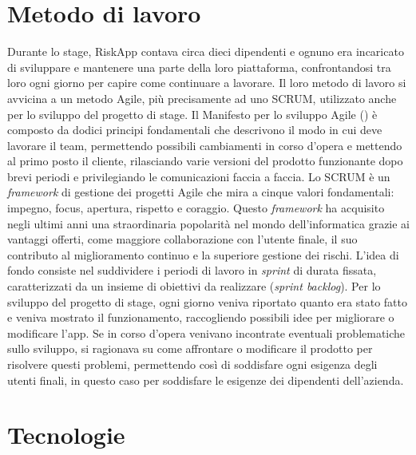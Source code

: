 \section{Metodo di lavoro}
Durante lo stage, RiskApp contava circa dieci dipendenti e ognuno era incaricato di sviluppare e mantenere una parte della loro piattaforma, confrontandosi tra loro ogni giorno per capire come continuare a lavorare.\newline
Il loro metodo di lavoro si avvicina a un metodo Agile, più precisamente ad uno SCRUM, utilizzato anche per lo sviluppo del progetto di stage.\newline
\newline
Il Manifesto per lo sviluppo Agile (\cite{site:manifesto-agile}) è composto da dodici principi fondamentali che descrivono il modo in cui deve lavorare il team, permettendo possibili cambiamenti in corso d'opera e mettendo al primo posto il cliente, rilasciando varie versioni del prodotto funzionante dopo brevi periodi e privilegiando le comunicazioni faccia a faccia.\newline
Lo SCRUM è un \emph{framework} di gestione dei progetti Agile che mira a cinque valori fondamentali: impegno, focus, apertura, rispetto e coraggio.\newline
Questo \emph{framework} ha acquisito negli ultimi anni una straordinaria popolarità nel mondo dell’informatica grazie ai vantaggi offerti, come maggiore collaborazione con l’utente finale, il suo contributo al miglioramento continuo e la superiore gestione dei rischi.\newline
L’idea di fondo consiste nel suddividere i periodi di lavoro in \emph{sprint} di durata fissata, caratterizzati da un insieme di obiettivi da realizzare (\emph{sprint backlog}).\newline
\newline
Per lo sviluppo del progetto di stage, ogni giorno veniva riportato quanto era stato fatto e veniva mostrato il funzionamento, raccogliendo possibili idee per migliorare o modificare l'app.\newline
Se in corso d'opera venivano incontrate eventuali problematiche sullo sviluppo, si ragionava su come affrontare o modificare il prodotto per risolvere questi problemi, permettendo così di soddisfare ogni esigenza degli utenti finali, in questo caso per soddisfare le esigenze dei dipendenti dell'azienda.

\newpage

\section{Tecnologie}
\label{sec:tecnologie}

